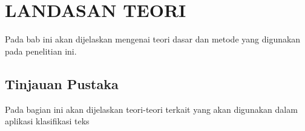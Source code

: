 \chapter{LANDASAN TEORI}
Pada bab ini akan dijelaskan mengenai teori dasar dan metode yang digunakan pada penelitian ini. 

%
\vspace{4.5pt}

\section{Tinjauan Pustaka}
Pada bagian ini akan dijelaskan teori-teori terkait yang akan digunakan dalam aplikasi klasifikasi teks 
